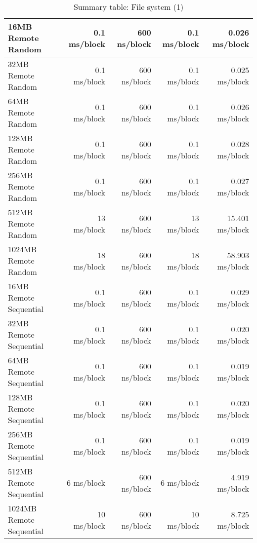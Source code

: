\begin{table}[h]
\begin{center}
\begin{tabular}{| l | r | r | r | r |}
16MB Remote Random	& 0.1 ms/block	& 600 ns/block  & 0.1 ms/block	& 0.026   ms/block \\ \hline
32MB Remote Random	& 0.1 ms/block	& 600 ns/block  & 0.1 ms/block	& 0.025   ms/block \\ \hline
64MB Remote Random	& 0.1 ms/block	& 600 ns/block  & 0.1 ms/block	& 0.026   ms/block \\ \hline
128MB Remote Random 	& 0.1 ms/block	& 600 ns/block  & 0.1 ms/block	& 0.028   ms/block \\ \hline
256MB Remote Random	& 0.1 ms/block	& 600 ns/block  & 0.1 ms/block	& 0.027   ms/block \\ \hline
512MB Remote Random	& 13 ms/block	& 600 ns/block  & 13 ms/block	& 15.401   ms/block \\ \hline
1024MB Remote Random	& 18 ms/block	& 600 ns/block  & 18 ms/block	& 58.903   ms/block \\ \hline\hline

16MB Remote Sequential	& 0.1 ms/block	& 600 ns/block  & 0.1 ms/block        & 0.029    ms/block \\ \hline
32MB Remote Sequential	& 0.1 ms/block	& 600 ns/block  & 0.1 ms/block        & 0.020    ms/block \\ \hline
64MB Remote Sequential	& 0.1 ms/block	& 600 ns/block  & 0.1 ms/block        & 0.019    ms/block \\ \hline
128MB Remote Sequential 	& 0.1 ms/block & 600 ns/block       & 0.1 ms/block        & 0.020    ms/block \\ \hline
256MB Remote Sequential	& 0.1 ms/block & 600 ns/block      & 0.1 ms/block       & 0.019    ms/block \\ \hline
512MB Remote Sequential	& 6 ms/block   & 600 ns/block      & 6 ms/block       & 4.919    ms/block \\ \hline
1024MB Remote Sequential	& 10 ms/block  & 600 ns/block      & 10 ms/block       & 8.725    ms/block \\ \hline\hline 



\end{tabular}
\end{center}

\caption{Summary table: File system (1)}

\end{table}



